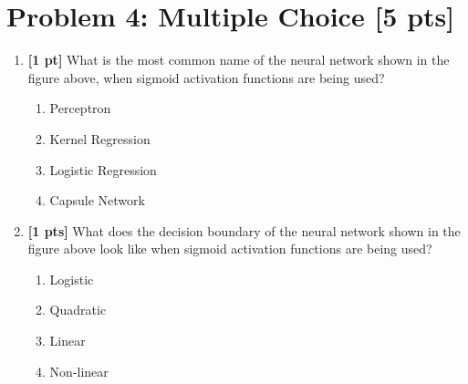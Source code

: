\section*{Problem 4: Multiple Choice [5 pts]} 

\def\layersep{2.5cm}

\begin{enumerate}[noitemsep]
    \begin{figure}[H]
    \centering
    \end{figure}
    \item \textbf{[1 pt]} What is the most common name of the neural network shown in the figure above, when sigmoid activation functions are being used?
    \begin{enumerate}
        \item Perceptron
        \item Kernel Regression
        \item Logistic Regression
        \item Capsule Network
    \end{enumerate}

    \begin{soln}
    \end{soln}

    
    \hfill \linebreak
    
    \item \textbf{[1 pts]} What does the decision boundary of the neural network shown in the figure above look like when sigmoid activation functions are being used?
    \begin{enumerate}
        \item Logistic
        \item Quadratic
        \item Linear
        \item Non-linear
    \end{enumerate}


\end{enumerate}
